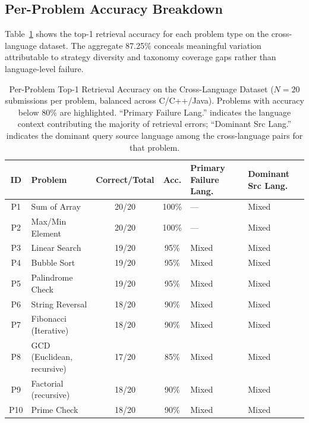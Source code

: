 \subsection{Per-Problem Accuracy Breakdown}
\label{subsec:per_problem}

Table~\ref{tab:per_problem} shows the top-1 retrieval accuracy for each problem type on the cross-language dataset. The aggregate 87.25\% conceals meaningful variation attributable to strategy diversity and taxonomy coverage gaps rather than language-level failure.

\begin{table}[!t]
\caption{Per-Problem Top-1 Retrieval Accuracy on the Cross-Language Dataset ($N=20$ submissions per problem, balanced across C/C++/Java). Problems with accuracy below 80\% are highlighted. ``Primary Failure Lang.'' indicates the language context contributing the majority of retrieval errors; ``Dominant Src Lang.'' indicates the dominant query source language among the cross-language pairs for that problem.}
\label{tab:per_problem}
\centering
\begin{tabular}{|c|l|c|c|l|l|}
\hline
\textbf{ID} & \textbf{Problem} & \textbf{Correct/Total} & \textbf{Acc.} & \textbf{Primary Failure Lang.} & \textbf{Dominant Src Lang.} \\
\hline
P1  & Sum of Array                & 20/20 & 100\% & ---                          & Mixed \\
P2  & Max/Min Element             & 20/20 & 100\% & ---                          & Mixed \\
P3  & Linear Search               & 19/20 & 95\%  & Mixed                        & Mixed \\
P4  & Bubble Sort                 & 19/20 & 95\%  & Mixed                        & Mixed \\
P5  & Palindrome Check            & 19/20 & 95\%  & Mixed                        & Mixed \\
P6  & String Reversal             & 18/20 & 90\%  & Mixed                        & Mixed \\
P7  & Fibonacci (Iterative)       & 18/20 & 90\%  & Mixed                        & Mixed \\
P8  & GCD (Euclidean, recursive)  & 17/20 & 85\%  & Mixed                        & Mixed \\
P9  & Factorial (recursive)       & 18/20 & 90\%  & Mixed                        & Mixed \\
P10 & Prime Check                 & 18/20 & 90\%  & Mixed                        & Mixed \\

\end{tabular}
\end{table}
